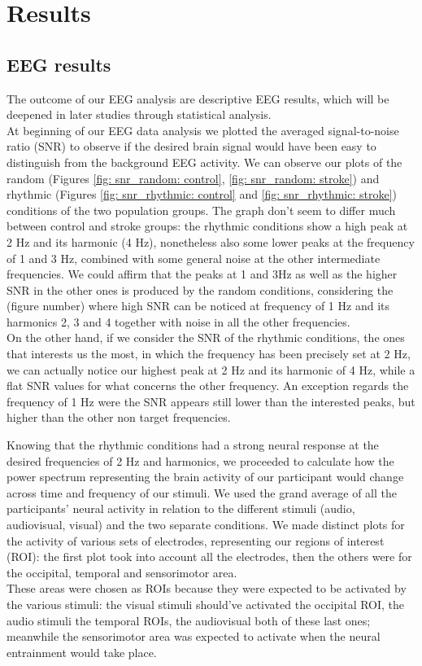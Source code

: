 \chapter{Results}
\section{EEG results}
The outcome of our EEG analysis are descriptive EEG results, which will be deepened in later studies through statistical analysis.\\At beginning of our EEG data analysis we plotted the averaged signal-to-noise ratio (SNR) to observe if the desired brain signal would have been easy to distinguish from the background EEG activity. We can observe our plots of the random (Figures \ref{fig: snr_random: control}, \ref{fig: snr_random: stroke}) and rhythmic (Figures \ref{fig: snr_rhythmic: control} and \ref{fig: snr_rhythmic: stroke}) conditions of the two population groups. The graph don't seem to differ much between control and stroke groups: the rhythmic conditions show a high peak at 2 Hz and its harmonic (4 Hz), nonetheless also some lower peaks at the frequency of 1 and 3 Hz, combined with some general noise at the other intermediate frequencies. We could affirm that the peaks at 1 and 3Hz as well as the higher SNR in the other ones is produced by the random conditions, considering the (figure number) where high SNR can be noticed at frequency of 1 Hz and its harmonics 2, 3 and 4 together with noise in all the other frequencies. \\
On the other hand, if we consider the SNR of the rhythmic conditions, the ones that interests us the most, in which the frequency has been precisely set at 2 Hz, we can actually notice our highest peak at 2 Hz and its harmonic of 4 Hz, while a flat SNR values for what concerns the other frequency. An exception regards the frequency of 1 Hz were the SNR appears still lower than the interested peaks, but higher than the other non target frequencies. 

Knowing that the rhythmic conditions had a strong neural response at the desired frequencies of 2 Hz and harmonics, we proceeded to calculate how the power spectrum representing the brain activity of our participant would change across time and frequency of our stimuli. We used the grand average of all the participants' neural activity in relation to the different stimuli (audio, audiovisual, visual) and the two separate conditions. We made distinct plots for the activity of various sets of electrodes, representing our regions of interest (ROI): the first plot took into account all the electrodes, then the others were for the occipital, temporal and sensorimotor area. \\
These areas were chosen as ROIs because they were expected to be activated by the various stimuli: the visual stimuli should've activated the occipital ROI, the audio stimuli the temporal ROIs, the audiovisual both of these last ones; meanwhile the sensorimotor area was expected to activate when the neural entrainment would take place. 

